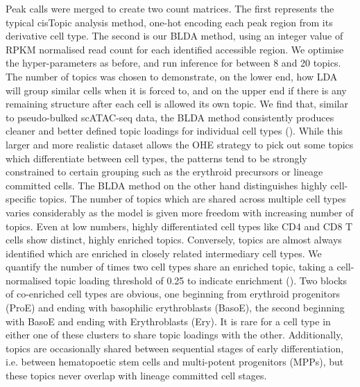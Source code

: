 Peak calls were merged to create two count matrices. The first represents the typical cisTopic analysis method, one-hot encoding each peak region from its derivative cell type. The second is our BLDA method, using an integer value of RPKM normalised read count for each identified accessible region. We optimise the hyper-parameters as before, and run inference for between 8 and 20 topics. The number of topics was chosen to demonstrate, on the lower end, how LDA will group similar cells when it is forced to, and on the upper end if there is any remaining structure after each cell is allowed its own topic. We find that, similar to pseudo-bulked scATAC-seq data, the BLDA method consistently produces cleaner and better defined topic loadings for individual cell types (). While this larger and more realistic dataset allows the OHE strategy to pick out some topics which differentiate between cell types, the patterns tend to be strongly constrained to certain grouping such as the erythroid precursors or lineage committed cells. The BLDA method on the other hand distinguishes highly cell-specific topics. The number of topics which are shared across multiple cell types varies considerably as the model is given more freedom with increasing number of topics. Even at low numbers, highly differentiated cell types like CD4 and CD8 T cells show distinct, highly enriched topics. Conversely, topics are almost always identified which are enriched in closely related intermediary cell types. We quantify the number of times two cell types share an enriched topic, taking a cell-normalised topic loading threshold of 0.25 to indicate enrichment (). Two blocks of co-enriched cell types are obvious, one beginning from erythroid progenitors (ProE) and ending with basophilic erythroblasts (BasoE), the second beginning with BasoE and ending with Erythroblasts (Ery). It is rare for a cell type in either one of these clusters to share topic loadings with the other. Additionally, topics are occasionally shared between sequential stages of early differentiation, i.e. between hematopoetic stem cells and multi-potent progenitors (MPPs), but these topics never overlap with lineage committed cell stages.  


